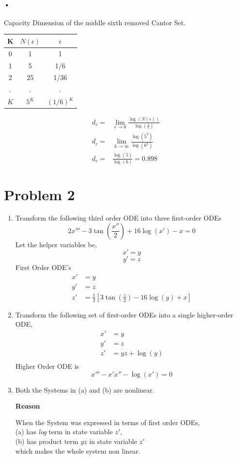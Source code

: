 \documentclass[11pt,a4paper]{article}
\begin{document}
\paragraph*{•}
Capacity Dimension of the middle sixth removed Cantor Set.
\begin{center}
\begin{tabular}{ |c|c|c| } 
 \hline 
 K & $N(\epsilon)$ & $\epsilon$ \\
 \hline 
 0 & 1 & 1 \\ 
 1 & 5 & 1/6 \\
 2 & 25 & 1/36 \\
 . & . & . \\
 $K$ & $5^K$ & $(1/6)^K$\\
 \hline
\end{tabular}
\end{center}
\begin{align*}
d_c = & \lim_{\epsilon \to 0} \frac{\log(N(\epsilon))}{\log(\frac{1}{\epsilon})}\\
d_c = &\lim_{k \to \infty} \frac{\log(5^{k})}{\log(6^{k})}\\
d_c = &\frac{\log(5)}{\log(6)} = 0.898
\end{align*}

\section*{Problem 2}
\begin{enumerate}[label=(\alph*)]

\item 
Transform the following third order ODE into three first-order ODEs \\
$$2x''' - 3{\tan(\frac{x''}{2})} + 16{\log(x')} - x = 0$$
Let the helper variables be, 
$$x' = y$$
$$y' = z$$
First Order ODE's
\begin{align*}
x' &= y\\
y' &= z\\
z' &= \frac{1}{2}[3{\tan(\frac{z}{2})} - 16{\log(y)} + x]
\end{align*}

\item 
Transform the following set of first-order ODEs into a single higher-order ODE,
\begin{align*}
x' &= y\\
y' &= z\\
z' &= yz + \log(y)\\
\end{align*}
Higher Order ODE is
$$ x''' - {x'}{x''} -\log(x') = 0$$

\item
Both the Systems in (a) and (b) are nonlinear.
\par\medskip
\textbf{Reason}\par\medskip
When the System was expressed in terms of first order ODEs,\\(a) has \textit{log} term in state variable $z'$,\\(b) has product term $yz$ in state variable $z'$\\ which makes the whole system non linear.

\end{enumerate}
\newpage
\end{document}
